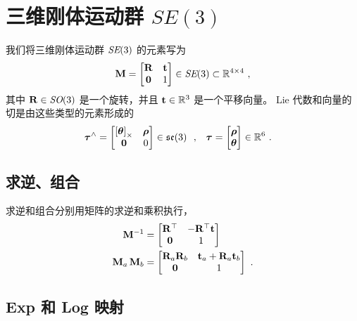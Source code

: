 

\section{三维刚体运动群 $SE(3)$}
\label{sec:SE3}


我们将三维刚体运动群 $\textit{SE}(3)$  的元素写为
%
\begin{align}
{\bf M}= \begin{bmatrix}
{\bf R} & {\bf t} \\ \bf0 & 1
\end{bmatrix} \in \textit{SE}(3) \subset {\mathbb R}^{4\times4}
~,
\end{align}
%
其中 ${\bf R}\in\textit{SO}(3)$ 是一个旋转，并且 ${\bf t}\in{\mathbb R}^3$ 是一个平移向量。
Lie 代数和向量的切是由这些类型的元素形成的
%
\begin{align}
{\bm \tau}^\wedge
  &= \begin{bmatrix}\left[{{\bm \theta}}\right]_\times & {\bm \rho} \\ \bf0 & 0\end{bmatrix} \in {\mathfrak {se}}(3)
  ~~,
& 
{\bm \tau}
  &= \begin{bmatrix}{\bm \rho} \\ {{\bm \theta}}\end{bmatrix}\in{\mathbb R}^6 
~.
\end{align}
%


\subsection{求逆、组合}

求逆和组合分别用矩阵的求逆和乘积执行，
%
\begin{align}
{\bf M}^{-1} &= \begin{bmatrix}
{\bf R}^{\top} & -{\bf R}^{\top}{\bf t} \\ \bf0 & 1
\end{bmatrix} 
\\
{\bf M}_a\,{\bf M}_b &= \begin{bmatrix}
{\bf R}_a{\bf R}_b & {\bf t}_a+{\bf R}_a{\bf t}_b \\ \bf0 & 1
\end{bmatrix} 
~.
\end{align}



\subsection{Exp 和 Log 映射}

